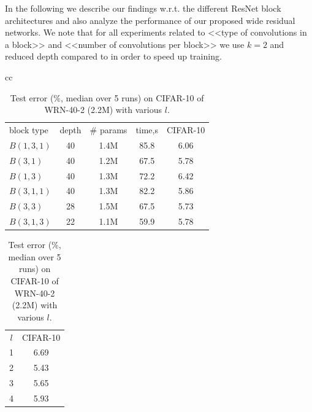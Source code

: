 \documentclass{bmvc2k}
\begin{document}
In the following we describe our findings w.r.t. the different  ResNet block architectures and also analyze the performance of our proposed wide residual networks.
We note that for all experiments related to <<type of convolutions in a block>> and <<number of convolutions per block>> we use  $k=2$ and reduced depth compared to \cite{basicblock2} in order to speed up training.\begin{table}
  \begin{tabular}{cc}
\begin{minipage}[c]{8cm}
  \centering
  \begin{tabular}{l|c|c|c|c}
    \hline
    block type & depth & \# params & time,s & CIFAR-10 \\
    \Xhline{2\arrayrulewidth}
$B(1,3,1)$ & 40 & 1.4M & 85.8 & 6.06  \\
$B(3,1)$ & 40 & 1.2M & 67.5 & 5.78  \\
$B(1,3)$ & 40 & 1.3M & 72.2 & 6.42  \\
$B(3,1,1)$ & 40 & 1.3M & 82.2 & 5.86  \\
$B(3,3)$ & 28 & 1.5M & 67.5 & 5.73  \\
$B(3,1,3)$ & 22 & 1.1M & 59.9 & 5.78  \\
    \hline
  \end{tabular}
  \caption{Test error (\%, median over 5 runs) on CIFAR-10 of residual networks with $k=2$ and different block types. Time column measures one training epoch.}
  \label{table:blocks}
\end{minipage}
\hspace{0.5cm}
\begin{minipage}[c]{4cm}
  \centering
  \begin{tabular}{c|c}
    \hline
    $l$ & CIFAR-10 \\
    \Xhline{2\arrayrulewidth}
    1 & 6.69 \\
    2 & 5.43 \\
    3 & 5.65 \\
    4 & 5.93 \\
    \hline
  \end{tabular}
  \caption{Test error (\%, median over 5 runs) on CIFAR-10 of WRN-40-2 (2.2M) with various $l$.}
  \label{table:blocks_l}
\end{minipage}
\end{tabular}
\end{table}
\end{document}
